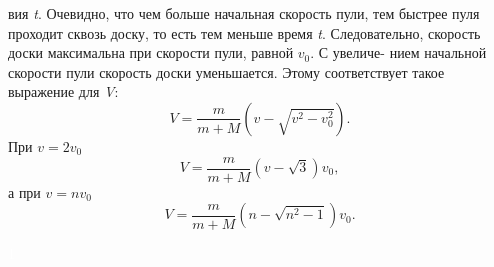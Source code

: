 \begin{minipage}[b]{0.44\textwidth}
	вия \textit t. Очевидно, что чем больше начальная\linebreak
	скорость пули, тем быстрее пуля проходит\linebreak
	сквозь доску, то есть тем меньше время \textit t.\linebreak
	Следовательно, скорость доски максимальна\linebreak
	при скорости пули, равной $v_0$. С увеличе-\linebreak
	нием начальной скорости пули скорость\linebreak
	доски уменьшается. Этому соответствует\linebreak
	такое выражение для \textit V:
	$$ V = \frac{m}{m+M}(v-\sqrt{v^2-v^2_{0}}).$$
	При $v = 2v_0$ 
	$$ V = \frac{m}{m+M}(v-\sqrt{3})v_0,$$
	а при $v=nv_0$
	$$ V= \frac{m}{m+M}(n-\sqrt{n^2-1})v_0.$$
\end{minipage}
\begin{minipage}[b]{0.04\textwidth} 
\end{minipage}
\begin{minipage}[b]{0.02\textwidth} 
\center
\textcolor{white}{\hbox{1}} 
\end{minipage}
